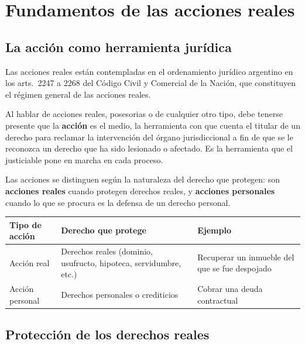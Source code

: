 \documentclass[12pt,oneside]{book}
\begin{document}
\chapter[Fundamentos de las acciones reales]{Fundamentos de las acciones reales}

\section{La acción como herramienta jurídica}

Las acciones reales están contempladas en el ordenamiento jurídico argentino en los arts.\ 2247 a 2268 del Código Civil y Comercial de la Nación, que constituyen el régimen general de las acciones reales.

Al hablar de acciones reales, posesorias o de cualquier otro tipo, debe tenerse presente que la \textbf{acción} es el medio, la herramienta con que cuenta el titular de un derecho para reclamar la intervención del órgano jurisdiccional a fin de que se le reconozca un derecho que ha sido lesionado o afectado. Es la herramienta que el justiciable pone en marcha en cada proceso.

Las acciones se distinguen según la naturaleza del derecho que protegen: son \textbf{acciones reales} cuando protegen derechos reales, y \textbf{acciones personales} cuando lo que se procura es la defensa de un derecho personal.

\begin{table}[H]
\centering
\begin{tabularx}{\textwidth}{
    >{\raggedright\arraybackslash}p{}
    >{\raggedright\arraybackslash}X
    >{\raggedright\arraybackslash}X
}
\toprule
\textbf{Tipo de acción} & \textbf{Derecho que protege} & \textbf{Ejemplo} \\
\midrule
Acción real & Derechos reales (dominio, usufructo, hipoteca, servidumbre, etc.) & Recuperar un inmueble del que se fue despojado \\
Acción personal & Derechos personales o crediticios & Cobrar una deuda contractual \\
\bottomrule
\end{tabularx}
\end{table}

\section{Protección de los derechos reales}
\end{document}
